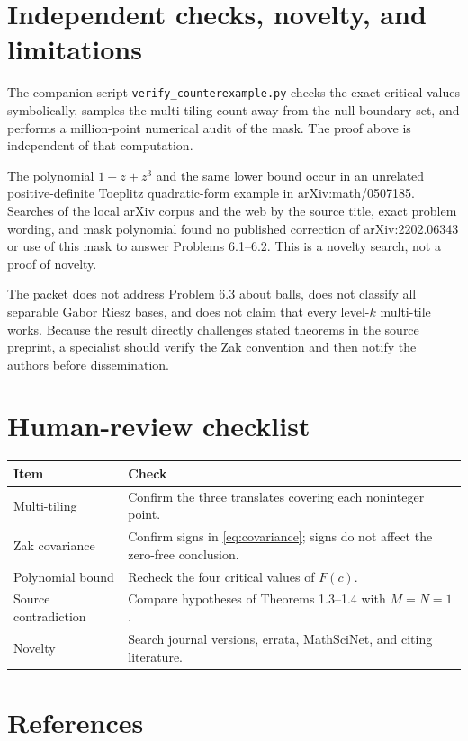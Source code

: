 \documentclass[11pt]{article}
\begin{document}
\section{Independent checks, novelty, and limitations}

The companion script \texttt{verify\_counterexample.py} checks the exact
critical values symbolically, samples the multi-tiling count away from the
null boundary set, and performs a million-point numerical audit of the mask.
The proof above is independent of that computation.

The polynomial $1+z+z^3$ and the same lower bound occur in an unrelated
positive-definite Toeplitz quadratic-form example in arXiv:math/0507185.
Searches of the local arXiv corpus and the web by the source title, exact
problem wording, and mask polynomial found no published correction of
arXiv:2202.06343 or use of this mask to answer Problems 6.1--6.2. This is a
novelty search, not a proof of novelty.

The packet does not address Problem 6.3 about balls, does not classify all
separable Gabor Riesz bases, and does not claim that every level-$k$
multi-tile works. Because the result directly challenges stated theorems in
the source preprint, a specialist should verify the Zak convention and then
notify the authors before dissemination.

\section*{Human-review checklist}

\begin{tabular}{@{}p{}p{}@{}}
\toprule
Item & Check \\
\midrule
Multi-tiling & Confirm the three translates covering each noninteger point.\\
Zak covariance & Confirm signs in \eqref{eq:covariance}; signs do not affect the zero-free conclusion.\\
Polynomial bound & Recheck the four critical values of $F(c)$.\\
Source contradiction & Compare hypotheses of Theorems 1.3--1.4 with $M=N=1$.\\
Novelty & Search journal versions, errata, MathSciNet, and citing literature.\\
\bottomrule
\end{tabular}

\section*{References}
\end{document}
